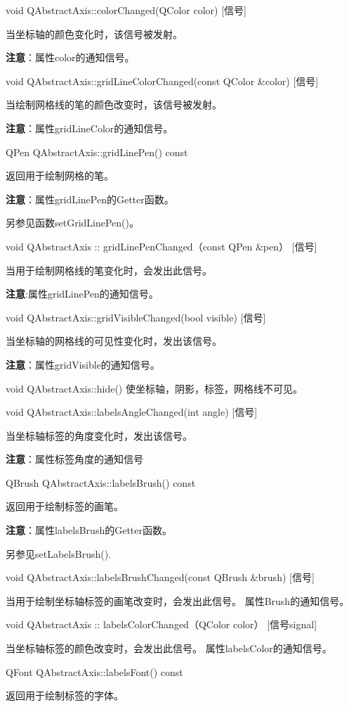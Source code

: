 void QAbstractAxis::colorChanged(QColor color) [信号] 

当坐标轴的颜色变化时，该信号被发射。 

\textbf{注意}：属性color的通知信号。

void QAbstractAxis::gridLineColorChanged(const QColor \&color) [信号] 

当绘制网格线的笔的颜色改变时，该信号被发射。

\textbf{注意}：属性gridLineColor的通知信号。

QPen QAbstractAxis::gridLinePen() const

返回用于绘制网格的笔。 

\textbf{注意}：属性gridLinePen的Getter函数。 

另参见函数setGridLinePen()。

void QAbstractAxis :: gridLinePenChanged（const QPen \&pen） [信号] 

当用于绘制网格线的笔变化时，会发出此信号。 

\textbf{注意}:属性gridLinePen的通知信号。

void QAbstractAxis::gridVisibleChanged(bool visible) [信号] 

当坐标轴的网格线的可见性变化时，发出该信号。 

\textbf{注意}：属性gridVisible的通知信号。

void QAbstractAxis::hide() 使坐标轴，阴影，标签，网格线不可见。

void QAbstractAxis::labelsAngleChanged(int angle) [信号]

当坐标轴标签的角度变化时，发出该信号。 

\textbf{注意}：属性标签角度的通知信号

QBrush QAbstractAxis::labelsBrush() const 

返回用于绘制标签的画笔。 

\textbf{注意}：属性labelsBrush的Getter函数。 

另参见setLabelsBrush().

void QAbstractAxis::labelsBrushChanged(const QBrush \&brush) [信号] 

当用于绘制坐标轴标签的画笔改变时，会发出此信号。 属性Brush的通知信号。

void QAbstractAxis :: labelsColorChanged（QColor color） [信号signal] 

当坐标轴标签的颜色改变时，会发出此信号。 属性labelsColor的通知信号。

QFont QAbstractAxis::labelsFont() const 

返回用于绘制标签的字体。 

